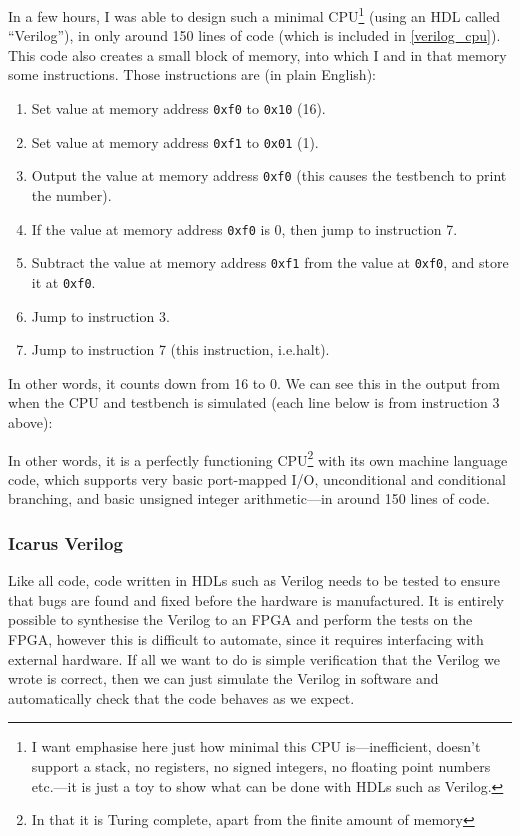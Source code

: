 \documentclass[12pt]{article}
\begin{document}
In a few hours, I was able to design such a minimal CPU\footnote{I want emphasise here just how minimal this CPU is---inefficient, doesn't support a stack, no registers, no signed integers, no floating point numbers etc.\@---it is just a toy to show what can be done with HDLs such as Verilog.} (using an HDL called ``Verilog''), in only around 150 lines of code (which is included in \ref{verilog_cpu}). This code also creates a small block of memory, into which I and in that memory some instructions. Those instructions are (in plain English):

\begin{enumerate}
	\item Set value at memory address \texttt{0xf0} to \texttt{0x10} (16).
	\item Set value at memory address \texttt{0xf1} to \texttt{0x01} (1).
	\item Output the value at memory address \texttt{0xf0} (this causes the testbench to print the number).
	\item If the value at memory address \texttt{0xf0} is 0, then jump to instruction 7.
	\item Subtract the value at memory address \texttt{0xf1} from the value at \texttt{0xf0}, and store it at \texttt{0xf0}.
	\item Jump to instruction 3.
	\item Jump to instruction 7 (this instruction, i.e.\@ halt).
\end{enumerate}

In other words, it counts down from 16 to 0. We can see this in the output from when the CPU and testbench is simulated (each line below is from instruction 3 above):



In other words, it is a perfectly functioning CPU\footnote{In that it is Turing complete, apart from the finite amount of memory} with its own machine language code, which supports very basic port-mapped I/O, unconditional and conditional branching, and basic unsigned integer arithmetic---in around 150 lines of code.

\subsubsection{Icarus Verilog}

Like all code, code written in HDLs such as Verilog needs to be tested to ensure that bugs are found and fixed before the hardware is manufactured. It is entirely possible to synthesise the Verilog to an FPGA and perform the tests on the FPGA, however this is difficult to automate, since it requires interfacing with external hardware. If all we want to do is simple verification that the Verilog we wrote is correct, then we can just simulate the Verilog in software and automatically check that the code behaves as we expect.
\end{document}
